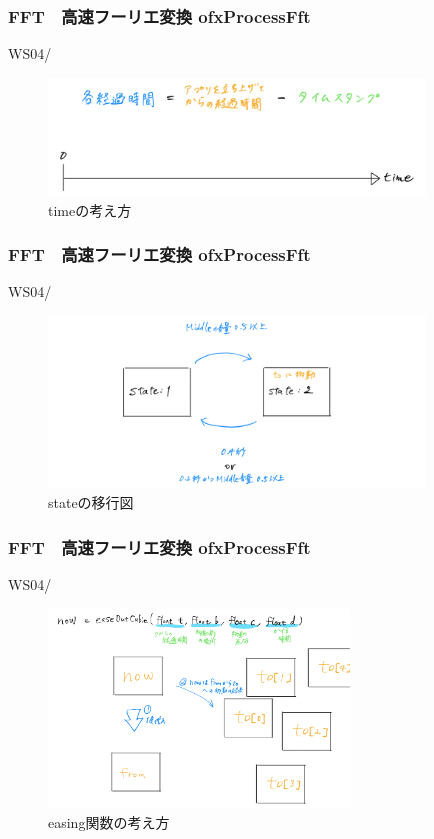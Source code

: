 \documentclass[10pt, dvipdfmx]{beamer}
\begin{document}
        \begin{frame}
            \frametitle{FFT　高速フーリエ変換 ofxProcessFft}
                \tiny
                WS04/
                \begin{figure}[htb]
                    \includegraphics[width=100mm]{images/fft-4.png}
                    \caption{timeの考え方}
                    \label{fig:fft-4}
                \end{figure}
        \end{frame}

        \begin{frame}
            \frametitle{FFT　高速フーリエ変換 ofxProcessFft}
                \tiny
                WS04/
                \begin{figure}[htb]
                    \includegraphics[width=100mm]{images/fft-5.png}
                    \caption{stateの移行図}
                    \label{fig:fft-5}
                \end{figure}
        \end{frame}

        \begin{frame}
            \frametitle{FFT　高速フーリエ変換 ofxProcessFft}
                \tiny
                WS04/
                \begin{figure}[htb]
                    \includegraphics[width=80mm]{images/fft-6.png}
                    \caption{easing関数の考え方}
                    \label{fig:fft-6}
                \end{figure}
        \end{frame}
\end{document}
